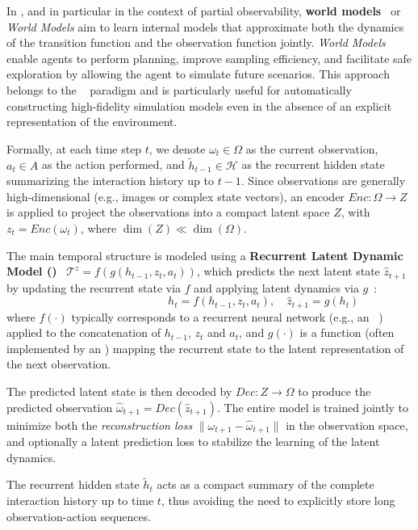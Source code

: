 In , and in particular in the context of partial observability, \textbf{world models}~\cite{ha2018recurrent, hafner2020dream} or \textit{World Models} aim to learn internal models that approximate both the dynamics of the transition function and the observation function jointly. \textit{World Models} enable agents to perform planning, improve sampling efficiency, and facilitate safe exploration by allowing the agent to simulate future scenarios. This approach belongs to the  ~\cite{moerland2020model} paradigm and is particularly useful for automatically constructing high-fidelity simulation models even in the absence of an explicit representation of the environment.

Formally, at each time step $t$, we denote $\omega_t \in \Omega$ as the current observation, $a_t \in A$ as the action performed, and $\tilde{h}_{t-1} \in \mathcal{H}$ as the recurrent hidden state summarizing the interaction history up to $t-1$. Since observations are generally high-dimensional (e.g., images or complex state vectors), an encoder $Enc: \Omega \rightarrow Z$ is applied to project the observations into a compact latent space $Z$, with $z_t = Enc(\omega_t)$, where $\dim(Z) \ll \dim(\Omega)$.

The main temporal structure is modeled using a \textbf{Recurrent Latent Dynamic Model ()}~\cite{hafner2020dream} $\mathcal{T}^{z} = f(g(h_{t-1}, z_t, a_t))$, which predicts the next latent state $\hat{z}_{t+1}$ by updating the recurrent state via $f$ and applying latent dynamics via $g$~:
\[
  \hspace{4cm}h_t = f(h_{t-1}, z_t, a_t), \quad \hat{z}_{t+1} = g(h_t)
\]
where $f(\cdot)$ typically corresponds to a recurrent neural network  (e.g., an ~\cite{hochreiter1997long}) applied to the concatenation of $h_{t-1} $, $z_t$ and $a_t$, and $g(\cdot)$ is a function (often implemented by an ) mapping the recurrent state to the latent representation of the next observation.

The predicted latent state is then decoded by $Dec: Z \rightarrow \Omega$ to produce the predicted observation $\hat{\omega}_{t+1} = Dec(\hat{z}_{t+1})$. The entire model is trained jointly to minimize both the \emph{reconstruction loss} $\|\omega_{t+1} - \hat{\omega}_{t+1}\|$ in the observation space, and optionally a latent prediction loss to stabilize the learning of the latent dynamics.

The recurrent hidden state $\tilde{h}_t$ acts as a compact summary of the complete interaction history up to time $t$, thus avoiding the need to explicitly store long observation-action sequences.

